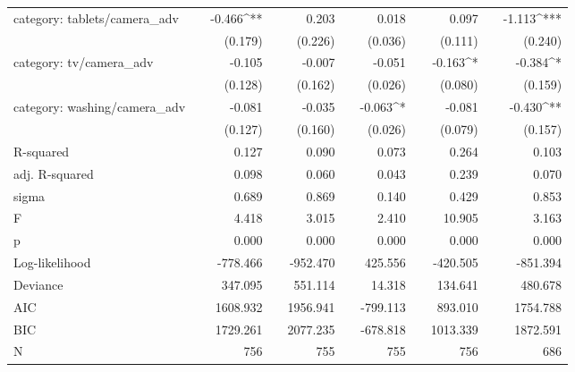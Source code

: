 \begin{tabular}{lcD{.}{.}{7}cD{.}{.}{7}cD{.}{.}{7}cD{.}{.}{7}cD{.}{.}{7}}
category: tablets/camera_adv       &  & -0.466^{**}  &&   0.203      &&   0.018      &&   0.097      && -1.113^{***}\\
                                   &  &  (0.179)     &&  (0.226)     &&  (0.036)     &&  (0.111)     &&  (0.240)    \\
category: tv/camera_adv            &  &  -0.105      &&  -0.007      &&  -0.051      && -0.163^{*}   && -0.384^{*}  \\
                                   &  &  (0.128)     &&  (0.162)     &&  (0.026)     &&  (0.080)     &&  (0.159)    \\
category: washing/camera_adv       &  &  -0.081      &&  -0.035      && -0.063^{*}   &&  -0.081      && -0.430^{**} \\
                                   &  &  (0.127)     &&  (0.160)     &&  (0.026)     &&  (0.079)     &&  (0.157)    \\
\midrule
R-squared                          &  &      0.127   &&      0.090   &&      0.073   &&      0.264   &&      0.103  \\
adj. R-squared                     &  &      0.098   &&      0.060   &&      0.043   &&      0.239   &&      0.070  \\
sigma                              &  &      0.689   &&      0.869   &&      0.140   &&      0.429   &&      0.853  \\
F                                  &  &      4.418   &&      3.015   &&      2.410   &&     10.905   &&      3.163  \\
p                                  &  &      0.000   &&      0.000   &&      0.000   &&      0.000   &&      0.000  \\
Log-likelihood                     &  &   -778.466   &&   -952.470   &&    425.556   &&   -420.505   &&   -851.394  \\
Deviance                           &  &    347.095   &&    551.114   &&     14.318   &&    134.641   &&    480.678  \\
AIC                                &  &   1608.932   &&   1956.941   &&   -799.113   &&    893.010   &&   1754.788  \\
BIC                                &  &   1729.261   &&   2077.235   &&   -678.818   &&   1013.339   &&   1872.591  \\
N                                  &  &    756       &&    755       &&    755       &&    756       &&    686      \\
\bottomrule
\end{tabular}
